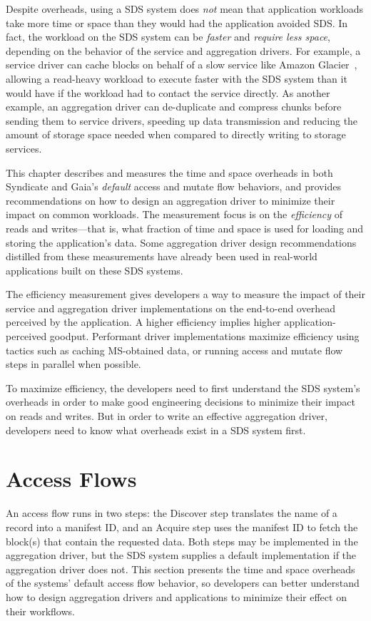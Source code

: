 Despite overheads, using a SDS system does \emph{not} mean that application workloads take more time or
space than they would had the application avoided SDS.  In fact,
the workload on the SDS system can be \emph{faster} and \emph{require less
space}, depending on the behavior of the service and aggregation drivers.
For example, a service driver can cache blocks on behalf of a slow service like Amazon Glacier~\cite{amazon-glacier},
allowing a read-heavy workload to execute faster with the SDS system
than it would have if the workload had to contact the service directly.
As another example, an aggregation driver can de-duplicate
and compress chunks before sending them to service drivers, speeding up data
transmission and reducing the amount of storage space needed when compared to
directly writing to storage services.

This chapter describes and measures the time and space overheads in both
Syndicate and Gaia's \emph{default} access and mutate flow behaviors, and
provides recommendations on how to design an aggregation driver to minimize
their impact on common workloads.  The measurement focus is on the
\emph{efficiency} of reads and writes---that is, what fraction of time and space
is used for loading and storing the application's data.
Some aggregation driver design recommendations distilled from
these measurements have already been used in real-world applications built
on these SDS systems.

The efficiency measurement gives developers a way to
measure the impact of their service and aggregation driver implementations on
the end-to-end overhead perceived by the application.
A higher efficiency implies higher application-perceived goodput.  Performant
driver implementations maximize efficiency using tactics such as caching
MS-obtained data, or running access and mutate flow steps in parallel when
possible.

To maximize efficiency, the developers need to first understand the SDS system's
overheads in order to make good engineering decisions to minimize their
impact on reads and writes.  But in order to write an effective aggregation
driver, developers need to know what overheads exist in a SDS system first.

\section{Access Flows}

An access flow runs in two steps:  the Discover step translates the
name of a record into a manifest ID, and an Acquire step uses the manifest
ID to fetch the block(s) that contain the requested data.  Both steps may be
implemented in the aggregation driver, but the SDS system supplies a default
implementation if the aggregation driver does not.
This section presents the time and space overheads of the systems' default
access flow behavior, so developers can better understand how to design
aggregation drivers and applications to minimize their effect on their
workflows.

